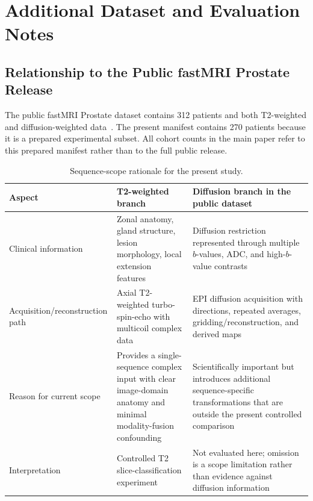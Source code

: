 \section{Additional Dataset and Evaluation Notes}\label{app:dataset}
\subsection{Relationship to the Public fastMRI Prostate Release}
The public fastMRI Prostate dataset contains 312 patients and both T2-weighted and diffusion-weighted data~\cite{Tibrewala2024FastMRIProstate}. The present manifest contains 270 patients because it is a prepared experimental subset. All cohort counts in the main paper refer to this prepared manifest rather than to the full public release.

\begin{table}[t]
\centering
\caption{Sequence-scope rationale for the present study.}
\label{tab:t2-scope}
\scriptsize
\begin{tabularx}{\textwidth}{L{2.4cm}L{5.2cm}X}
\toprule
Aspect & T2-weighted branch & Diffusion branch in the public dataset \\
\midrule
Clinical information & Zonal anatomy, gland structure, lesion morphology, local extension features~\cite{Turkbey2019PIRADSv21} & Diffusion restriction represented through multiple $b$-values, ADC, and high-$b$-value contrasts \\
Acquisition/\linebreak reconstruction path & Axial T2-weighted turbo-spin-echo with multicoil complex data & EPI diffusion acquisition with directions, repeated averages, gridding/reconstruction, and derived maps~\cite{Tibrewala2024FastMRIProstate} \\
Reason for current scope & Provides a single-sequence complex input with clear image-domain anatomy and minimal modality-fusion confounding & Scientifically important but introduces additional sequence-specific transformations that are outside the present controlled comparison \\
Interpretation & Controlled T2 slice-classification experiment & Not evaluated here; omission is a scope limitation rather than evidence against diffusion information \\
\bottomrule
\end{tabularx}
\end{table}

